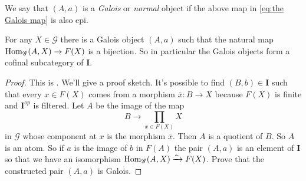 \begin{definition}
\label{def:galois object or normal object}
We say that $(A,a)$ is a \emph{Galois}  or \emph{normal}  object if the above map in \cref{eq:the Galois map} is also epi.
\end{definition}

\begin{proposition}
\label{prop:the galois objects form a cofinal subcategory of I}
For any $X \in \mathscr{G}$ there is a Galois object $(A,a)$ such that the natural map $\operatorname{Hom}_{\mathscr{G}}(A,X) \to F(X)$ is a bijection. So in particular the Galois objects form a cofinal subcategory of $\mathbf{I}$.
\end{proposition}
\begin{proof}
This is \cite[Proposition 8.46]{johnstone77}. We'll give a proof sketch.
It's possible to find $(B,b) \in \mathbf{I}$ such that every $x \in F(X)$ comes from a morphism $\overline{x} : B \to X$ because $F(X)$ is finite and $\mathbf{I}^{op}$ is filtered. Let $A$ be the image of the map
\[ B \to \prod_{x \in F(X)}X \]
in $\mathscr{G}$ whose component at $x$ is the morphism $\overline{x}$. Then $A$ is a quotient of $B$. So $A$ is an atom. So if $a$ is the image of $b$ in $F(A)$ the pair $(A,a)$ is an element of $\mathbf{I}$ so that we have an isomorphism $\operatorname{Hom}_{\mathscr{G}}(A,X) \xrightarrow{\sim} F(X)$.
Prove that the constructed pair $(A,a)$ is Galois. \qedhere
\end{proof}

